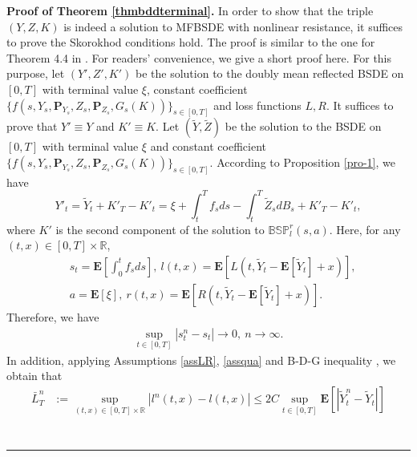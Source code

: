 \documentclass[10pt]{article}%
\numberwithin{equation}{section}
\newenvironment{proof}[1][Proof]{\noindent \textbf{#1.} }{\  \rule{0.5em}{0.5em}}
\def \E{\mathbf{E}}
\def \P{\mathbf{P}}
\begin{document}
\begin{proof}[Proof of Theorem \ref{thmbddterminal}]
In order to show that the triple $(Y,Z,K)$ is indeed a solution to MFBSDE with nonlinear resistance, it suffices to prove the Skorokhod conditions hold. The proof is similar to the one for Theorem 4.4 in \cite{LS}. For readers' convenience, we give a short proof here. For this purpose, let $(Y',Z',K')$ be the solution to the doubly mean reflected BSDE on $[0,T]$ with terminal value $\xi$, constant coefficient $\{f(s,Y_s,\P_{Y_s},Z_s,\P_{Z_s},G_s(K))\}_{s\in[0,T]}$ and loss functions $L,R$. It suffices to prove that $Y'\equiv Y$ and $K'\equiv K$. Let $(\widetilde{Y},\widetilde{Z})$ be the solution to the BSDE on $[0,T]$ with terminal value $\xi$ and constant coefficient $\{f(s,Y_s,\P_{Y_s},Z_s,\P_{Z_s},G_s(K))\}_{s\in[0,T]}$. According to Proposition \ref{pro-1}, we have
\begin{equation*}
Y'_{t}=\widetilde{Y}_t+K'_{T}-K'_{t}=\xi+\int_{t}^{T} f_s ds-\int_{t}^{T}\widetilde{Z}_s dB_s+K'_{T}-K'_{t},    
\end{equation*}
where $K'$ is the second component of the solution to $\mathbb{BSP}^{r}_{l}(s,a)$. 
Here, for any $(t,x)\in[0,T]\times \mathbb{R}$,
\begin{equation}\label{lrsaL}
\begin{split}
& s_t=\E\left[\int_{0}^t f_s ds\right], \ l(t,x)=\E\left[L(t,\widetilde{Y}_t-\E[\widetilde{Y}_t]+x)\right],\\
& a=\E[\xi], \ r(t,x)=\E\left[R(t,\widetilde{Y}_t-\E[\widetilde{Y}_t]+x)\right].%
\end{split}
\end{equation}
Therefore, we have
\begin{align*}
   \sup_{t\in[0,T]}|s_{t}^{n}-s_{t}|\rightarrow 0, \ n\rightarrow \infty.
\end{align*}
In addition, applying Assumptions \ref{assLR}, \ref{assqua} and B-D-G inequality , we obtain that 
$$
\begin{aligned}
	\bar{L}^n_{T}&:= \sup_{(t,x)\in[0,T]\times \mathbb{R}}\left|l^n(t,x)-l(t,x)\right|\leq 2C\sup_{t\in[0,T]}\mathbf{E}\left[\left|\widetilde{Y}^n_t-\widetilde{Y}_t\right|\right]\\

\end{aligned}$$
\end{proof}
\end{document}
